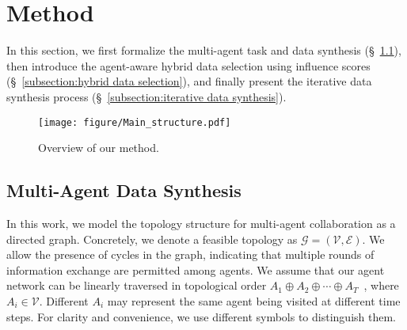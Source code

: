 \section{Method}
\label{section:method}
In this section, we first formalize the multi-agent task and data synthesis (§~\ref{subsection:multi-agent-data-synthesis}), then introduce the agent-aware  hybrid  data selection using influence scores (§~\ref{subsection:hybrid data selection}), and finally present the iterative data synthesis process (§~\ref{subsection:iterative data synthesis}).

\begin{figure*}
    \centering
    \texttt{[image: figure/Main\_structure.pdf]}
    \caption{Overview of our method. } \vspace{-0.3cm}
    \label{fig:framework}
\end{figure*}

\subsection{Multi-Agent Data Synthesis} \label{subsection:multi-agent-data-synthesis}
In this work, we model the topology structure for multi-agent collaboration as a directed graph. Concretely, we denote a feasible topology as $\mathcal{G}=(\mathcal{V}, \mathcal{E})$.  We allow the presence of cycles in the graph, indicating that multiple rounds of information exchange are permitted among agents. We assume that our agent network can be linearly traversed in topological order $A_1\oplus A_2 \oplus \cdots \oplus A_T$~\cite{Bondy1976, book:gross:2005, qian2024}, where $A_i \in \mathcal{V}$. Different $A_i$ may represent the same agent being visited at different time steps. For clarity and convenience, we use different symbols to distinguish them.

